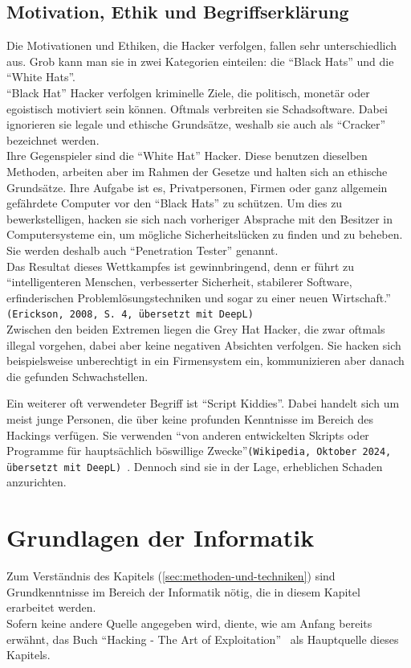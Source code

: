 \documentclass[11pt, a4paper]{article}
\begin{document}
\subsection{Motivation, Ethik und Begriffserklärung}
Die Motivationen und Ethiken, die Hacker verfolgen, fallen sehr unterschiedlich aus. Grob kann man sie in zwei Kategorien einteilen: die ``Black Hats'' und die ``White Hats''. \\``Black Hat'' Hacker verfolgen kriminelle Ziele, die politisch, monetär oder egoistisch motiviert sein können. Oftmals verbreiten sie Schadsoftware. Dabei ignorieren sie legale und ethische Grundsätze, weshalb sie auch als ``Cracker'' bezeichnet werden.\\Ihre Gegenspieler sind die ``White Hat'' Hacker. Diese benutzen dieselben Methoden, arbeiten aber im Rahmen der Gesetze und halten sich an ethische Grundsätze. Ihre Aufgabe ist es, Privatpersonen, Firmen oder ganz allgemein gefährdete Computer vor den ``Black Hats'' zu schützen. Um dies zu bewerkstelligen, hacken sie sich nach vorheriger Absprache mit den Besitzer in Computersysteme ein, um mögliche Sicherheitslücken zu finden und zu beheben. Sie werden deshalb auch ``Penetration Tester'' genannt. \\ Das Resultat dieses Wettkampfes ist gewinnbringend, denn er führt zu ``intelligenteren Menschen, verbesserter Sicherheit, stabilerer Software, erfinderischen Problemlösungstechniken und sogar zu einer neuen Wirtschaft.'' \texttt{(Erickson, 2008, S. 4, übersetzt mit DeepL)} \cite{erickson2008hacking}\\Zwischen den beiden Extremen liegen die Grey Hat Hacker, die zwar oftmals illegal vorgehen, dabei aber keine negativen Absichten verfolgen. Sie hacken sich beispielsweise unberechtigt in ein Firmensystem ein, kommunizieren aber danach die gefunden Schwachstellen. \cite{WhiteHatBlackHat:paper, BlackHat34:online}

Ein weiterer oft verwendeter Begriff ist ``Script Kiddies''. Dabei handelt sich um meist junge Personen, die über keine profunden Kenntnisse im Bereich des Hackings verfügen. Sie verwenden ``von anderen entwickelten Skripts oder Programme für hauptsächlich böswillige Zwecke''\texttt{(Wikipedia, Oktober 2024, übersetzt mit DeepL)}~\cite{ScriptkiWikipedia:online}. Dennoch sind sie in der Lage, erheblichen Schaden anzurichten.~\cite{ScriptkiWikipedia:online}

\newpage
\section{Grundlagen der Informatik}\label{sec:grundlagen-der-informatik}
Zum Verständnis des Kapitels  (\ref{sec:methoden-und-techniken}) sind Grundkenntnisse im Bereich der Informatik nötig, die in diesem Kapitel erarbeitet werden. \\Sofern keine andere Quelle angegeben wird, diente, wie am Anfang bereits erwähnt, das Buch ``Hacking - The Art of Exploitation''~\cite{erickson2008hacking} als Hauptquelle dieses Kapitels.
\end{document}
